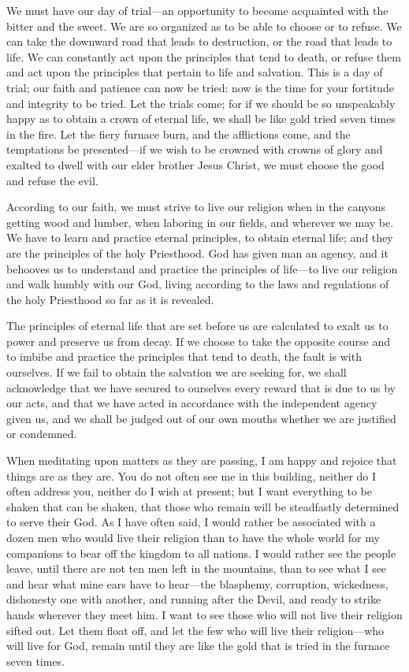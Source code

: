 					We must have our day of trial---an opportunity to become acquainted with the bitter and the sweet. We are so organized as to be able to choose or to refuse. We can take the downward road that leads to destruction, or the road that leads to life. We can constantly act upon the principles that tend to death, or refuse them and act upon the principles that pertain to life and salvation. This is a day of trial; our faith and patience can now be tried: now is the time for your fortitude and integrity to be tried. Let the trials come; for if we should be so unspeakably happy as to obtain a crown of eternal life, we shall be like gold tried seven times in the fire. Let the fiery furnace burn, and the afflictions come, and the temptations be presented---if we wish to be crowned with crowns of glory and exalted to dwell with our elder brother Jesus Christ, we must choose the good and refuse the evil.

					According to our faith, we must strive to live our religion when in the canyons getting wood and lumber, when laboring in our fields, and wherever we may be. We have to learn and practice eternal principles, to obtain eternal life; and they are the principles of the holy Priesthood. God has given man an agency, and it behooves us to understand and practice the principles of life---to live our religion and walk humbly with our God, living according to the laws and regulations of the holy Priesthood so far as it is revealed.

					The principles of eternal life that are set before us are calculated to exalt us to power and preserve us from decay. If we choose to take the opposite course and to imbibe and practice the principles that tend to death, the fault is with ourselves. If we fail to obtain the salvation we are seeking for, we shall acknowledge that we have secured to ourselves every reward that is due to us by our acts, and that we have acted in accordance with the independent agency given us, and we shall be judged out of our own mouths whether we are justified or condemned.

					When meditating upon matters as they are passing, I am happy and rejoice that things are as they are. You do not often see me in this building, neither do I often address you, neither do I wish at present; but I want everything to be shaken that can be shaken, that those who remain will be steadfastly determined to serve their God. As I have often said, I would rather be associated with a dozen men who would live their religion than to have the whole world for my companions to bear off the kingdom to all nations. I would rather see the people leave, until there are not ten men left in the mountains, than to see what I see and hear what mine ears have to hear---the blasphemy, corruption, wickedness, dishonesty one with another, and running after the Devil, and ready to strike hands wherever they meet him. I want to see those who will not live their religion sifted out. Let them float off, and let the few who will live their religion---who will live for God, remain until they are like the gold that is tried in the furnace seven times.

